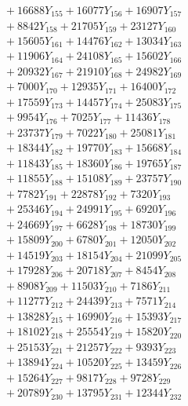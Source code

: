 \documentclass[a4paper,10pt]{article}
\begin{document}
{\begin{align}
&\;  + 16688 Y_{155} + 16077 Y_{156} + 16907 Y_{157} \\[0.3ex]
&\;  + 8842 Y_{158} + 21705 Y_{159} + 23127 Y_{160} \\[0.3ex]
&\;  + 15605 Y_{161} + 14476 Y_{162} + 13034 Y_{163} \\[0.3ex]
&\;  + 11906 Y_{164} + 24108 Y_{165} + 15602 Y_{166} \\[0.3ex]
&\;  + 20932 Y_{167} + 21910 Y_{168} + 24982 Y_{169} \\[0.3ex]
&\;  + 7000 Y_{170} + 12935 Y_{171} + 16400 Y_{172} \\[0.3ex]
&\;  + 17559 Y_{173} + 14457 Y_{174} + 25083 Y_{175} \\[0.3ex]
&\;  + 9954 Y_{176} + 7025 Y_{177} + 11436 Y_{178} \\[0.5ex]\allowbreak
&\;  + 23737 Y_{179} + 7022 Y_{180} + 25081 Y_{181} \\[0.3ex]
&\;  + 18344 Y_{182} + 19770 Y_{183} + 15668 Y_{184} \\[0.3ex]
&\;  + 11843 Y_{185} + 18360 Y_{186} + 19765 Y_{187} \\[0.3ex]
&\;  + 11855 Y_{188} + 15108 Y_{189} + 23757 Y_{190} \\[0.3ex]
&\;  + 7782 Y_{191} + 22878 Y_{192} + 7320 Y_{193} \\[0.3ex]
&\;  + 25346 Y_{194} + 24991 Y_{195} + 6920 Y_{196} \\[0.3ex]
&\;  + 24669 Y_{197} + 6628 Y_{198} + 18730 Y_{199} \\[0.3ex]
&\;  + 15809 Y_{200} + 6780 Y_{201} + 12050 Y_{202} \\[0.3ex]
&\;  + 14519 Y_{203} + 18154 Y_{204} + 21099 Y_{205} \\[0.3ex]
&\;  + 17928 Y_{206} + 20718 Y_{207} + 8454 Y_{208} \\[0.5ex]\allowbreak
&\;  + 8908 Y_{209} + 11503 Y_{210} + 7186 Y_{211} \\[0.3ex]
&\;  + 11277 Y_{212} + 24439 Y_{213} + 7571 Y_{214} \\[0.3ex]
&\;  + 13828 Y_{215} + 16990 Y_{216} + 15393 Y_{217} \\[0.3ex]
&\;  + 18102 Y_{218} + 25554 Y_{219} + 15820 Y_{220} \\[0.3ex]
&\;  + 25153 Y_{221} + 21257 Y_{222} + 9393 Y_{223} \\[0.3ex]
&\;  + 13894 Y_{224} + 10520 Y_{225} + 13459 Y_{226} \\[0.3ex]
&\;  + 15264 Y_{227} + 9817 Y_{228} + 9728 Y_{229} \\[0.3ex]
&\;  + 20789 Y_{230} + 13795 Y_{231} + 12344 Y_{232} \\[0.3ex]

\end{align}}
\end{document}
